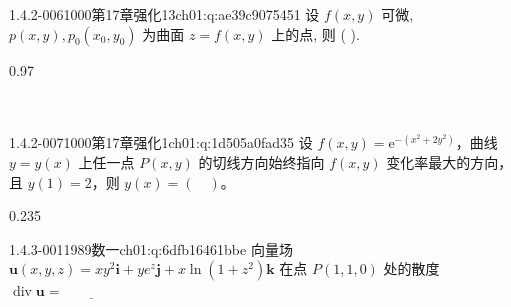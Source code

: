 \begin{q}{1.4.2-006}{1000第17章强化13}{ch01:q:ae39c9075451}
设 $f(x,y)$ 可微, $p(x,y), p_0(x_0,y_0)$ 为曲面 $z=f(x,y)$ 上的点, 则 ( ).
\begin{opts}{0.97}
\\[0.3ex]
\\[0.3ex]
\\[0.3ex]
\end{opts}
\end{q}

\begin{q}{1.4.2-007}{1000第17章强化1}{ch01:q:1d505a0fad35}
设 $f(x,y)=\mathrm{e}^{-(x^2+2y^2)}$，曲线 $y=y(x)$ 上任一点 $P(x,y)$ 的切线方向始终指向 $f(x,y)$ 变化率最大的方向，且 $y(1)=2$，则 $y(x)=(\quad)$。
\begin{opts}{0.235}
\hfill{}\hfill{}\hfill{}
\end{opts}
\end{q}

\par\addvspace{2.4ex}\noindent
\begin{minipage}{\linewidth}

\begin{q}{1.4.3-001}{1989数一}{ch01:q:6dfb16461bbe}
向量场 $\mathbf{u}(x,y,z)=xy^{2}\mathbf{i}+ye^{z}\mathbf{j}+x\ln(1+z^{2})\mathbf{k}$ 在点 $P(1,1,0)$ 处的散度 $\operatorname{div}\mathbf{u}=\underline{\hspace{4em}}$
\end{q}
\end{minipage}


